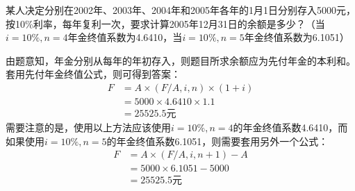 \documentclass[
  10pt,
  twoside,
  openany,
  b5paper, %
  colorscheme = black, %
  xits = false,
]{qyxf-book}
\begin{document}
 某人决定分别在2002年、2003年、2004年和2005年各年的1月1日分别存入5000元，按10\%利率，每年复利一次，要求计算2005年12月31日的余额是多少？（当$i=10\%,n=4$年金终值系数为4.6410，当$i=10\%,n=5$年金终值系数为6.1051）

\begin{note}
	由题意知，年金分别从每年的年初存入，则题目所求余额应为先付年金的本利和。套用先付年金终值公式，则可得到答案：
	\begin{equation*}
		\begin{aligned}
			F &= A \times (F/A,i,n) \times (1+i) \\
			  &= 5000 \times 4.6410 \times 1.1 \\
			  &= 25525.5 \text{元}
		\end{aligned}
	\end{equation*}
	需要注意的是，使用以上方法应该使用$i=10\%,n=4$的年金终值系数4.6410，而如果使用$i=10\%,n=5$的年金终值系数6.1051，则需要套用另外一个公式：
	\begin{equation*}
		\begin{aligned}
			F &= A \times (F/A,i,n+1) -A \\
			  &= 5000 \times 6.1051 - 5000 \\
			  &= 25525.5 \text{元}
		\end{aligned}
	\end{equation*}
\end{note}
\end{document}
